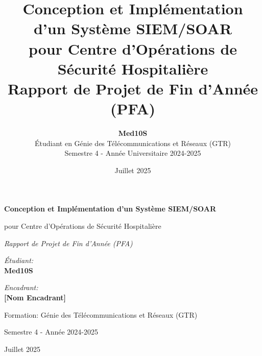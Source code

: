 \documentclass[12pt,a4paper,twoside]{report}
\title{%
    \textbf{Conception et Implémentation d'un Système SIEM/SOAR} \\
    \vspace{0.5cm}
    \large{pour Centre d'Opérations de Sécurité Hospitalière} \\
    \vspace{1cm}
    \normalsize{Rapport de Projet de Fin d'Année (PFA)}
}
\author{%
    \textbf{Med10S} \\
    \vspace{0.3cm}
    \small{Étudiant en Génie des Télécommunications et Réseaux (GTR)} \\
    \small{Semestre 4 - Année Universitaire 2024-2025}
}
\date{Juillet 2025}
\begin{document}
\begin{titlepage}
    \centering


    \vspace{2cm}

    {\huge\bfseries Conception et Implémentation d'un Système SIEM/SOAR\par}
    \vspace{1cm}
    {\Large pour Centre d'Opérations de Sécurité Hospitalière\par}

    \vspace{2cm}

    {\Large\itshape Rapport de Projet de Fin d'Année (PFA)\par}

    \vspace{2cm}

    \begin{minipage}{0.4\textwidth}
        \begin{flushleft} \large
            \emph{Étudiant:}\\
            \textbf{Med10S}
        \end{flushleft}
    \end{minipage}%
    \begin{minipage}{0.4\textwidth}
        \begin{flushright} \large
            \emph{Encadrant:} \\
            \textbf{[Nom Encadrant]}
        \end{flushright}
    \end{minipage}

    \vspace{2cm}

    {\large Formation: Génie des Télécommunications et Réseaux (GTR)\par}
    {\large Semestre 4 - Année 2024-2025\par}

    \vfill

    {\large Juillet 2025\par}

    \vspace{1cm}


\end{titlepage}
\end{document}

